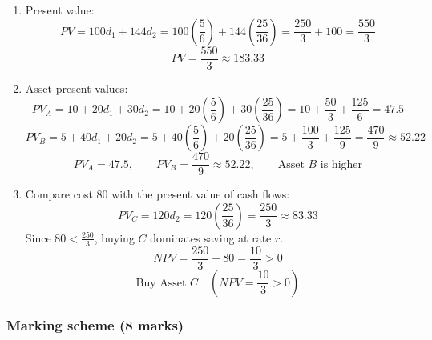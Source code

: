 \documentclass[12pt]{article}
\begin{document}
\begin{enumerate}[label=(\alph*)]
\item Present value:
$$PV = 100d_1 + 144d_2 = 100\left(\frac{5}{6}\right) + 144\left(\frac{25}{36}\right) = \frac{250}{3} + 100 = \frac{550}{3}$$
$$\boxed{PV = \frac{550}{3} \approx 183.33}$$

\item Asset present values:
$$PV_A = 10 + 20d_1 + 30d_2 = 10 + 20\left(\frac{5}{6}\right) + 30\left(\frac{25}{36}\right) = 10 + \frac{50}{3} + \frac{125}{6} = 47.5$$
$$PV_B = 5 + 40d_1 + 20d_2 = 5 + 40\left(\frac{5}{6}\right) + 20\left(\frac{25}{36}\right) = 5 + \frac{100}{3} + \frac{125}{9} = \frac{470}{9} \approx 52.22$$
$$\boxed{PV_A = 47.5, \qquad PV_B = \frac{470}{9} \approx 52.22, \qquad \text{Asset } B \text{ is higher}}$$

\item Compare cost $80$ with the present value of cash flows:
$$PV_C = 120d_2 = 120\left(\frac{25}{36}\right) = \frac{250}{3} \approx 83.33$$
Since $80 < \frac{250}{3}$, buying $C$ dominates saving at rate $r$.
$$NPV = \frac{250}{3} - 80 = \frac{10}{3} > 0$$
$$\boxed{\text{Buy Asset } C \quad \left(NPV = \frac{10}{3} > 0\right)}$$
\end{enumerate}

\vspace{1.5cm}
\newpage
\subsubsection*{Marking scheme (8 marks)}
\end{document}
